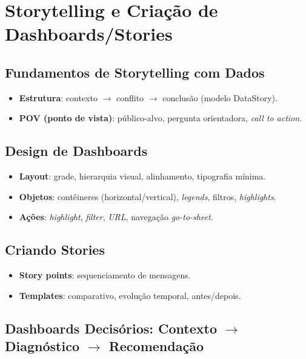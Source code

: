 

\chapter{Storytelling e Criação de Dashboards/Stories} %

\section{Fundamentos de Storytelling com Dados}
\begin{itemize}[leftmargin=*]
  \item \textbf{Estrutura}: contexto $\rightarrow$ conflito $\rightarrow$ conclusão (modelo DataStory).
  \item \textbf{POV (ponto de vista)}: público-alvo, pergunta orientadora, \textit{call to action}.
\end{itemize}

\section{Design de Dashboards}
\begin{itemize}[leftmargin=*]
  \item \textbf{Layout}: grade, hierarquia visual, alinhamento, tipografia mínima.
  \item \textbf{Objetos}: contêineres (horizontal/vertical), \textit{legends}, filtros, \textit{highlights}.
  \item \textbf{Ações}: \textit{highlight}, \textit{filter}, \textit{URL}, navegação \textit{go-to-sheet}.
\end{itemize}

\section{Criando Stories}
\begin{itemize}[leftmargin=*]
  \item \textbf{Story points}: sequenciamento de mensagens.
  \item \textbf{Templates}: comparativo, evolução temporal, antes/depois.
\end{itemize}

\section{Dashboards Decisórios: Contexto $\rightarrow$ Diagnóstico $\rightarrow$ Recomendação}

